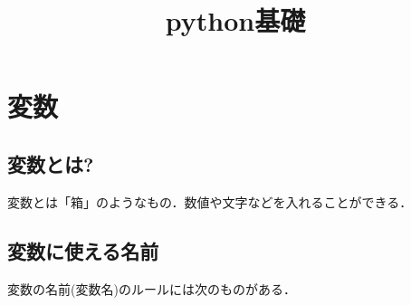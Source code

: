 \documentclass{jsarticle}
\title{python基礎}
\date{} %
\author{}
\begin{document}
\maketitle

\vspace{-20mm}

\section{変数}
\subsection{変数とは?}
変数とは「箱」のようなもの．数値や文字などを入れることができる．

\subsection{変数に使える名前}
変数の名前(変数名)のルールには次のものがある．
\end{document}
